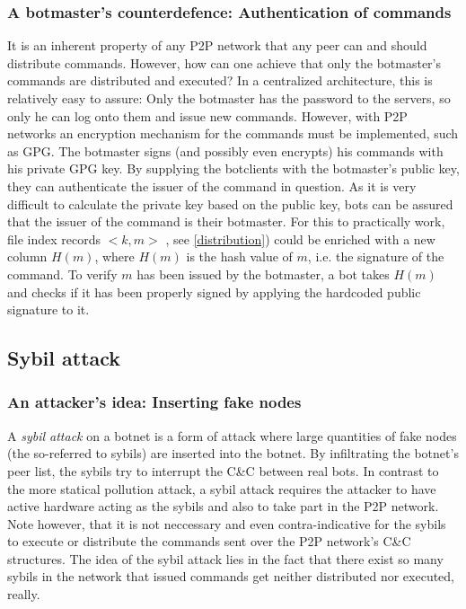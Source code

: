 \documentclass{llncs}
\begin{document}
\subsubsection{A botmaster's counterdefence: Authentication of commands}
It is an inherent property of any P2P network that any peer can and
should distribute commands. However, how can one achieve that only the
botmaster's commands are distributed and executed? In a centralized
architecture, this is relatively easy to assure: Only the botmaster
has the password to the servers, so only he can log onto them and
issue new commands. However, with P2P networks an encryption mechanism
for the commands must be implemented, such as GPG\cite{GPG}. The
botmaster signs (and possibly even encrypts) his commands with his
private GPG key. By supplying the botclients with the botmaster's
public key, they can authenticate the issuer of the command in
question. As it is very difficult to calculate the private key based
on the public key, bots can be assured that the issuer of the command
is their botmaster. For this to practically work, file index records
$<k, m>$ , see \ref{distribution}) could be enriched with a new column
$H(m)$, where $H(m)$ is the hash value of $m$, i.e. the signature of
the command.\cite{wang2009systematic} To verify $m$ has been issued by
the botmaster, a bot takes $H(m)$ and checks if it has been properly
signed by applying the hardcoded public signature to it.


\subsection{Sybil attack}
\subsubsection{An attacker's idea: Inserting fake nodes}
A {\it sybil attack} on a botnet is a form of attack where large
quantities of fake nodes (the so-referred to sybils) are inserted into
the botnet. By infiltrating the botnet's peer list, the sybils try to
interrupt the C\&C between real bots. In contrast to the more statical
pollution attack, a sybil attack requires the attacker to have active
hardware acting as the sybils and also to take part in the P2P
network. Note however, that it is not neccessary and even
contra-indicative for the sybils to execute or distribute the commands
sent over the P2P network's C\&C structures. The idea of the sybil
attack lies in the fact that there exist so many sybils in the network
that issued commands get neither distributed nor executed,
really. \cite{davis2008sybil}
\end{document}

